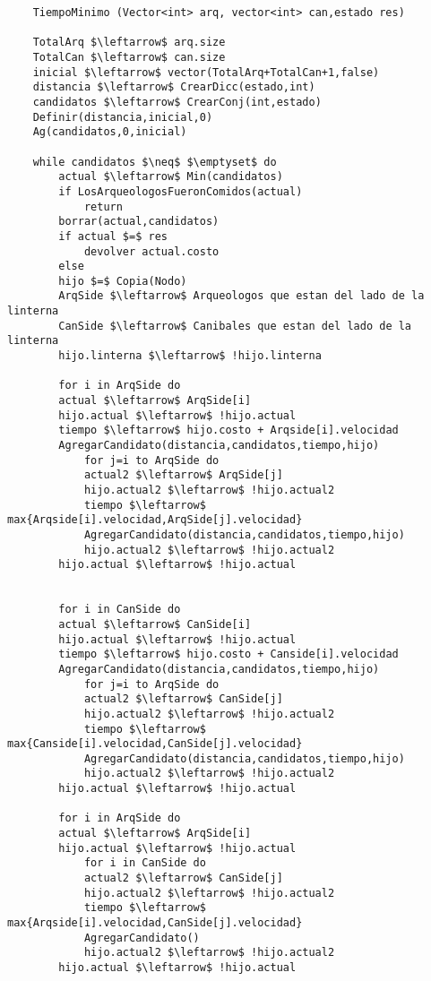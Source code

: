 \lstset{basicstyle=\large}
\begin{lstlisting}
	TiempoMinimo (Vector<int> arq, vector<int> can,estado res)

	TotalArq $\leftarrow$ arq.size
	TotalCan $\leftarrow$ can.size
	inicial $\leftarrow$ vector(TotalArq+TotalCan+1,false)
	distancia $\leftarrow$ CrearDicc(estado,int)
	candidatos $\leftarrow$ CrearConj(int,estado)
	Definir(distancia,inicial,0)
	Ag(candidatos,0,inicial)

	while candidatos $\neq$ $\emptyset$ do
		actual $\leftarrow$ Min(candidatos)
		if LosArqueologosFueronComidos(actual)
			return
		borrar(actual,candidatos)
		if actual $=$ res
			devolver actual.costo
		else
		hijo $=$ Copia(Nodo)
		ArqSide $\leftarrow$ Arqueologos que estan del lado de la linterna
		CanSide $\leftarrow$ Canibales que estan del lado de la linterna
		hijo.linterna $\leftarrow$ !hijo.linterna 

		for i in ArqSide do
		actual $\leftarrow$ ArqSide[i] 
		hijo.actual $\leftarrow$ !hijo.actual
		tiempo $\leftarrow$ hijo.costo + Arqside[i].velocidad
		AgregarCandidato(distancia,candidatos,tiempo,hijo)
			for j=i to ArqSide do
			actual2 $\leftarrow$ ArqSide[j]
			hijo.actual2 $\leftarrow$ !hijo.actual2
			tiempo $\leftarrow$ max{Arqside[i].velocidad,ArqSide[j].velocidad}
			AgregarCandidato(distancia,candidatos,tiempo,hijo)		
			hijo.actual2 $\leftarrow$ !hijo.actual2
		hijo.actual $\leftarrow$ !hijo.actual


		for i in CanSide do
		actual $\leftarrow$ CanSide[i] 
		hijo.actual $\leftarrow$ !hijo.actual
		tiempo $\leftarrow$ hijo.costo + Canside[i].velocidad
		AgregarCandidato(distancia,candidatos,tiempo,hijo)
			for j=i to ArqSide do
			actual2 $\leftarrow$ CanSide[j]
			hijo.actual2 $\leftarrow$ !hijo.actual2
			tiempo $\leftarrow$ max{Canside[i].velocidad,CanSide[j].velocidad}
			AgregarCandidato(distancia,candidatos,tiempo,hijo)	
			hijo.actual2 $\leftarrow$ !hijo.actual2
		hijo.actual $\leftarrow$ !hijo.actual

		for i in ArqSide do
		actual $\leftarrow$ ArqSide[i] 
		hijo.actual $\leftarrow$ !hijo.actual
			for i in CanSide do
			actual2 $\leftarrow$ CanSide[j]
			hijo.actual2 $\leftarrow$ !hijo.actual2
			tiempo $\leftarrow$ max{Arqside[i].velocidad,CanSide[j].velocidad}
			AgregarCandidato() 	
			hijo.actual2 $\leftarrow$ !hijo.actual2
		hijo.actual $\leftarrow$ !hijo.actual

\end{lstlisting}



